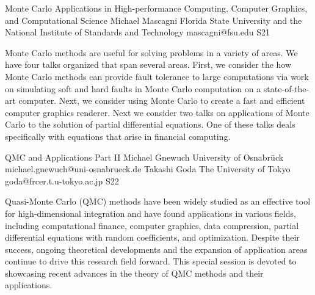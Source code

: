 

\clearpage

\begin{session}
 {Monte Carlo Applications in High-performance Computing, Computer Graphics, and Computational Science}%
 {Michael Mascagni}%
 {Florida State University and the National Institute of Standards and Technology}%
 {mascagni@fsu.edu}%
{}{}{}
 {S21}%
{}

 Monte Carlo methods are useful for solving problems in a variety of areas.  We have four talks organized that span several areas.  First, we consider the how Monte Carlo methods can provide fault tolerance to large computations via work on simulating soft and hard faults in Monte Carlo computation on a state-of-the-art computer.  Next, we consider using Monte Carlo to create a fast and efficient computer graphics renderer. Next we consider two talks on applications of Monte Carlo to the solution of partial differential equations.  One of these talks deals specifically with equations that arise in financial computing.
\end{session}



\clearpage

\begin{session}
 {QMC and Applications Part II}%
 {Michael Gnewuch}%
 {University of Osnabr\"uck}%
 {michael.gnewuch@uni-osnabrueck.de}%
 {Takashi Goda}%
 {The University of Tokyo}%
 {goda@frcer.t.u-tokyo.ac.jp}%
 {S22}%
 {}%

 Quasi-Monte Carlo (QMC) methods have been widely studied as an effective tool for high-dimensional integration and have found applications in various fields, including computational finance, computer graphics, data compression, partial differential equations with random coefficients, and %
 optimization.
 Despite their success, ongoing theoretical developments and the expansion of application areas continue to drive this research field forward. This special session is devoted to showcasing recent advances in the theory of QMC methods and their applications.
\end{session}

